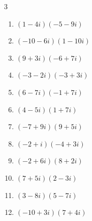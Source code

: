 \begin{multicols}{3}
\begin{enumerate}
        \phantom{$\displaystyle =30+75i$}

  \item $\displaystyle (1-4i)(-5-9i)$

        \phantom{$\displaystyle =-41+11i$}

  \item $\displaystyle (-10-6i)(1-10i)$

        \phantom{$\displaystyle =-70+94i$}

  \item $\displaystyle (9+3i)(-6+7i)$

        \phantom{$\displaystyle =-75+45i$}

  \item $\displaystyle (-3-2i)(-3+3i)$

        \phantom{$\displaystyle =15-3i$}

  \item $\displaystyle (6-7i)(-1+7i)$

        \phantom{$\displaystyle =43+49i$}

  \item $\displaystyle (4-5i)(1+7i)$

        \phantom{$\displaystyle =39+23i$}

  \item $\displaystyle (-7+9i)(9+5i)$

        \phantom{$\displaystyle =-108+46i$}

  \item $\displaystyle (-2+i)(-4+3i)$

        \phantom{$\displaystyle =5-10i$}

  \item $\displaystyle (-2+6i)(8+2i)$

        \phantom{$\displaystyle =-28+44i$}

  \item $\displaystyle (7+5i)(2-3i)$

        \phantom{$\displaystyle =29-11i$}

  \item $\displaystyle (3-8i)(5-7i)$

        \phantom{$\displaystyle =-41-61i$}

\columnbreak %

\resetques

  \item $\displaystyle (-10+3i)(7+4i)$

        \phantom{$\displaystyle =-82-19i$}


\end{enumerate}
\end{multicols}
